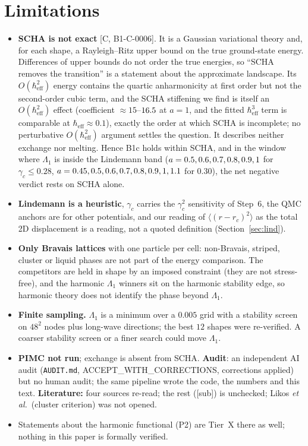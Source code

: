\documentclass[10pt]{article}
\newcommand{\tier}[1]{\textsf{[#1]}}
\newcommand{\sub}{\textsf{[sub]}}
\newcommand{\hb}{\hbar_{\mathrm{eff}}}
\begin{document}
\section{Limitations}\label{sec:limits}
\begin{itemize}\setlength\itemsep{1pt}
\item \textbf{SCHA is not exact} \tier{C, B1-C-0006}. It is a Gaussian variational theory and, for each shape, a Rayleigh--Ritz upper bound on the true ground-state energy. Differences of upper bounds do not order the true energies, so ``SCHA removes the transition'' is a statement about the approximate landscape. Its $O(\hb^2)$ energy contains the quartic anharmonicity at first order but not the second-order cubic term, and the SCHA stiffening we find is itself an $O(\hb^2)$ effect (coefficient $\approx15$--$16.5$ at $a=1$, and the fitted $\hb^3$ term is comparable at $\hb\approx0.1$), exactly the order at which SCHA is incomplete; no perturbative $O(\hb^2)$ argument settles the question. It describes neither exchange nor melting. Hence B1c holds within SCHA, and in the window where $\Lambda_1$ is inside the Lindemann band ($a=0.5, 0.6, 0.7, 0.8, 0.9, 1$ for $\gamma_c\le0.28$, $a=0.45, 0.5, 0.6, 0.7, 0.8, 0.9, 1, 1.1$ for $0.30$), the net negative verdict rests on SCHA alone.
\item \textbf{Lindemann is a heuristic}, $\gamma_c$ carries the $\gamma_c^2$ sensitivity of Step~6, the QMC anchors are for other potentials, and our reading of $\langle(r-r_c)^2\rangle$ as the total 2D displacement is a reading, not a quoted definition (Section~\ref{sec:lind}).
\item \textbf{Only Bravais lattices} with one particle per cell: non-Bravais, striped, cluster or liquid phases are not part of the energy comparison. The competitors are held in shape by an imposed constraint (they are not stress-free), and the harmonic $\Lambda_1$ winners sit on the harmonic stability edge, so harmonic theory does not identify the phase beyond $\Lambda_1$.
\item \textbf{Finite sampling.} $\Lambda_1$ is a minimum over a $0.005$ grid with a stability screen on $48^2$ nodes plus long-wave directions; the best $12$ shapes were re-verified. A coarser stability screen or a finer search could move $\Lambda_1$.
\item \textbf{PIMC not run}; exchange is absent from SCHA. \textbf{Audit}: an independent AI audit (\texttt{AUDIT.md}, ACCEPT\_WITH\_CORRECTIONS, corrections applied) but no human audit; the same pipeline wrote the code, the numbers and this text. \textbf{Literature:} four sources re-read; the rest (\sub) is unchecked; Likos \emph{et al.}\ (cluster criterion) was not opened.
\item Statements about the harmonic functional (P2) are Tier~X there as well; nothing in this paper is formally verified.
\end{itemize}
\end{document}
